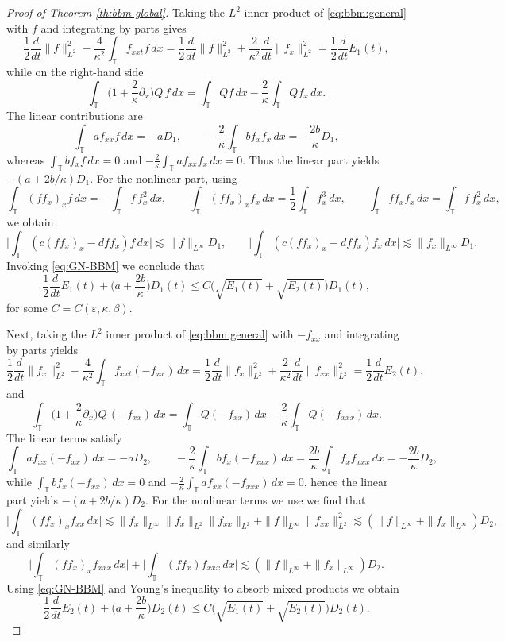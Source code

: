 \documentclass[reqno]{amsart}
\newcommand{\TT}{\mathbb T}
\theoremstyle{definition}
\numberwithin{equation}{section}
\numberwithin{theorem}{section}
\numberwithin{definition}{section}
\begin{document}
\begin{proof}[Proof of Theorem \ref{th:bbm-global}]
	Taking the $L^2$ inner product of \eqref{eq:bbm:general} with $f$ and integrating by parts gives
	\[
	\frac12\frac{d}{dt}\|f\|_{L^2}^2-\frac{4}{\kappa^2}\int_\TT f_{xxt}f\,dx
	=\frac12\frac{d}{dt}\|f\|_{L^2}^2+\frac{2}{\kappa^2}\frac{d}{dt}\|f_x\|_{L^2}^2
	=\frac12\frac{d}{dt}E_1(t),
	\]
	while on the right-hand side
	\[
	\int_\TT\Big(1+\frac{2}{\kappa}\partial_x\Big)Q\,f\,dx
	=\int_\TT Q f\,dx-\frac{2}{\kappa}\int_\TT Q f_x\,dx.
	\]
	The linear contributions are
	\[
	\int_\TT a f_{xx}f\,dx=-aD_1,\qquad
	-\frac{2}{\kappa}\int_\TT b f_x f_x\,dx=-\frac{2b}{\kappa}D_1,
	\]
	whereas $\int_\TT b f_x f\,dx=0$ and $-\frac{2}{\kappa}\int_\TT a f_{xx} f_x\,dx=0$. Thus the linear part yields
	$-(a+2b/\kappa)D_1$. For the nonlinear part, using
	\[
	\int_\TT (ff_x)_x f\,dx=-\int_\TT f\,f_x^2\,dx,\qquad
	\int_\TT (ff_x)_x f_x\,dx=\frac12\int_\TT f_x^3\,dx,\qquad
	\int_\TT f f_x f_x\,dx=\int_\TT f\,f_x^2\,dx,
	\]
	we obtain
	\[
	\Big|\int_\TT (c(ff_x)_x-dff_x)f\,dx\Big|\lesssim \|f\|_{L^\infty}D_1,\qquad
	\Big|\int_\TT (c(ff_x)_x-dff_x)f_x\,dx\Big|\lesssim \|f_x\|_{L^\infty}D_1.
	\]
	Invoking \eqref{eq:GN-BBM} we conclude that
	\begin{equation}\label{ineq:E1}
		\frac12\frac{d}{dt}E_1(t)+\Big(a+\frac{2b}{\kappa}\Big)D_1(t)
		\le C\big(\sqrt{E_1(t)}+\sqrt{E_2(t)}\big)D_1(t),
	\end{equation}
	for some $C=C(\varepsilon,\kappa,\beta)$. \medskip
		
	Next, taking the $L^2$ inner product of \eqref{eq:bbm:general} with $-f_{xx}$ and integrating by parts yields
	\[
	\frac12\frac{d}{dt}\|f_x\|_{L^2}^2-\frac{4}{\kappa^2}\int_\TT f_{xxt}(-f_{xx})\,dx
	=\frac12\frac{d}{dt}\|f_x\|_{L^2}^2+\frac{2}{\kappa^2}\frac{d}{dt}\|f_{xx}\|_{L^2}^2
	=\frac12\frac{d}{dt}E_2(t),
	\]
	and
	\[
	\int_\TT\Big(1+\frac{2}{\kappa}\partial_x\Big)Q\,(-f_{xx})\,dx
	=\int_\TT Q(-f_{xx})\,dx-\frac{2}{\kappa}\int_\TT Q(-f_{xxx})\,dx.
	\]
	The linear terms satisfy
	\[
	\int_\TT a f_{xx}(-f_{xx})\,dx=-aD_2,\qquad
	-\frac{2}{\kappa}\int_\TT b f_x(-f_{xxx})\,dx
	=\frac{2b}{\kappa}\int_\TT f_x f_{xxx}\,dx=-\frac{2b}{\kappa}D_2,
	\]
	while $\int_\TT b f_x(-f_{xx})\,dx=0$ and $-\frac{2}{\kappa}\int_\TT a f_{xx}(-f_{xxx})\,dx=0$, hence the linear part yields
	$-(a+2b/\kappa)D_2$. For the nonlinear terms we use we find that
	\[
	\Big|\int_\TT (ff_x)_x f_{xx}\,dx\Big|
	\lesssim \|f_x\|_{L^\infty}\|f_x\|_{L^2}\|f_{xx}\|_{L^2}+\|f\|_{L^\infty}\|f_{xx}\|_{L^2}^2
	\lesssim (\|f\|_{L^\infty}+\|f_x\|_{L^\infty})D_2,
	\]
	and similarly
	\[
	\Big|\int_\TT (ff_x)_x f_{xxx}\,dx\Big|
	+\Big|\int_\TT (f f_x) f_{xxx}\,dx\Big|
	\lesssim (\|f\|_{L^\infty}+\|f_x\|_{L^\infty})D_2.
	\]
	Using \eqref{eq:GN-BBM} and Young's inequality to absorb mixed products we obtain
	\begin{equation}\label{ineq:E2}
		\frac12\frac{d}{dt}E_2(t)+\Big(a+\frac{2b}{\kappa}\Big)D_2(t)
		\le C\big(\sqrt{E_1(t)}+\sqrt{E_2(t)}\big)D_2(t).
	\end{equation}
	

\end{proof}
\end{document}
